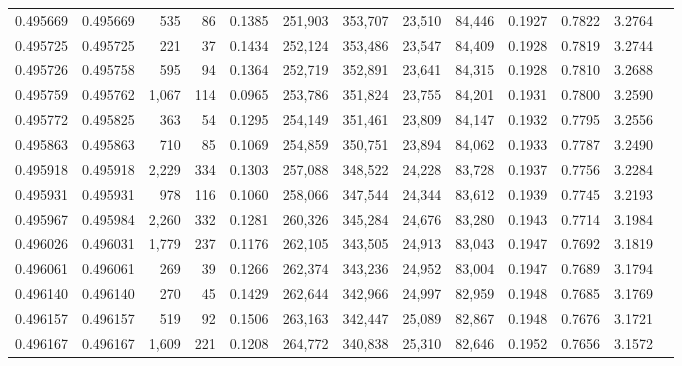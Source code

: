 \begin{tabular}{rrrrrrrrrrrrr}
0.495669 & 0.495669 &   535 &    86 &                                     0.1385 & 251,903 & 353,707 &  23,510 &  84,446 & 0.1927 & 0.7822 & 3.2764 \\
0.495725 & 0.495725 &   221 &    37 &                                     0.1434 & 252,124 & 353,486 &  23,547 &  84,409 & 0.1928 & 0.7819 & 3.2744 \\
0.495726 & 0.495758 &   595 &    94 &                                     0.1364 & 252,719 & 352,891 &  23,641 &  84,315 & 0.1928 & 0.7810 & 3.2688 \\
0.495759 & 0.495762 & 1,067 &   114 &                                     0.0965 & 253,786 & 351,824 &  23,755 &  84,201 & 0.1931 & 0.7800 & 3.2590 \\
0.495772 & 0.495825 &   363 &    54 &                                     0.1295 & 254,149 & 351,461 &  23,809 &  84,147 & 0.1932 & 0.7795 & 3.2556 \\
0.495863 & 0.495863 &   710 &    85 &                                     0.1069 & 254,859 & 350,751 &  23,894 &  84,062 & 0.1933 & 0.7787 & 3.2490 \\
0.495918 & 0.495918 & 2,229 &   334 &                                     0.1303 & 257,088 & 348,522 &  24,228 &  83,728 & 0.1937 & 0.7756 & 3.2284 \\
0.495931 & 0.495931 &   978 &   116 &                                     0.1060 & 258,066 & 347,544 &  24,344 &  83,612 & 0.1939 & 0.7745 & 3.2193 \\
0.495967 & 0.495984 & 2,260 &   332 &                                     0.1281 & 260,326 & 345,284 &  24,676 &  83,280 & 0.1943 & 0.7714 & 3.1984 \\
0.496026 & 0.496031 & 1,779 &   237 &                                     0.1176 & 262,105 & 343,505 &  24,913 &  83,043 & 0.1947 & 0.7692 & 3.1819 \\
0.496061 & 0.496061 &   269 &    39 &                                     0.1266 & 262,374 & 343,236 &  24,952 &  83,004 & 0.1947 & 0.7689 & 3.1794 \\
0.496140 & 0.496140 &   270 &    45 &                                     0.1429 & 262,644 & 342,966 &  24,997 &  82,959 & 0.1948 & 0.7685 & 3.1769 \\
0.496157 & 0.496157 &   519 &    92 &                                     0.1506 & 263,163 & 342,447 &  25,089 &  82,867 & 0.1948 & 0.7676 & 3.1721 \\
0.496167 & 0.496167 & 1,609 &   221 &                                     0.1208 & 264,772 & 340,838 &  25,310 &  82,646 & 0.1952 & 0.7656 & 3.1572 \\

\end{tabular}
